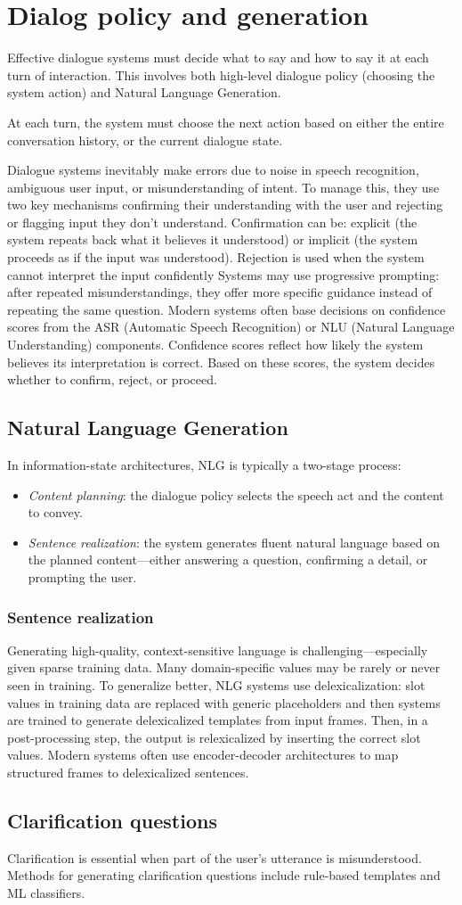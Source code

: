 \section{Dialog policy and generation}

Effective dialogue systems must decide what to say and how to say it at each turn of interaction. 
This involves both high-level dialogue policy (choosing the system action) and Natural Language Generation.

At each turn, the system must choose the next action based on either the entire conversation history, or the current dialogue state.

Dialogue systems inevitably make errors due to noise in speech recognition, ambiguous user input, or misunderstanding of intent. 
To manage this, they use two key mechanisms confirming their understanding with the user and rejecting or flagging input they don't understand. 
Confirmation can be: explicit (the system repeats back what it believes it understood) or implicit (the system proceeds as if the input was understood).
Rejection is used when the system cannot interpret the input confidently
Systems may use progressive prompting: after repeated misunderstandings, they offer more specific guidance instead of repeating the same question.
Modern systems often base decisions on confidence scores from the ASR (Automatic Speech Recognition) or NLU (Natural Language Understanding) components. 
Confidence scores reflect how likely the system believes its interpretation is correct.
Based on these scores, the system decides whether to confirm, reject, or proceed.

\subsection{Natural Language Generation}
In information-state architectures, NLG is typically a two-stage process:
\begin{itemize}
    \item \textit{Content planning}: the dialogue policy selects the speech act and the content to convey.
    \item \textit{Sentence realization}: the system generates fluent natural language based on the planned content—either answering a question, confirming a detail, or prompting the user.
\end{itemize}

\subsubsection{Sentence realization}
Generating high-quality, context-sensitive language is challenging—especially given sparse training data. 
Many domain-specific values may be rarely or never seen in training.
To generalize better, NLG systems use delexicalization: slot values in training data are replaced with generic placeholders and then systems are trained to generate delexicalized templates from input frames.
Then, in a post-processing step, the output is relexicalized by inserting the correct slot values.
Modern systems often use encoder-decoder architectures to map structured frames to delexicalized sentences.

\subsection{Clarification questions}
Clarification is essential when part of the user's utterance is misunderstood.
Methods for generating clarification questions include rule-based templates and ML classifiers. 